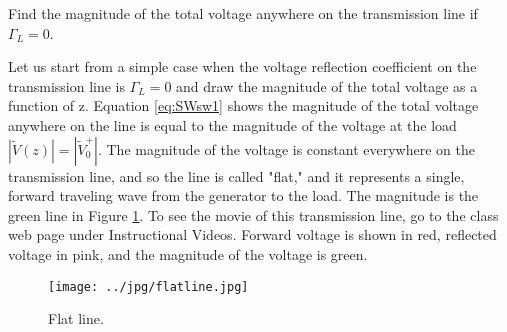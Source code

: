 \documentclass{ximera}
\begin{document}
\begin{example}

Find the magnitude of the total voltage anywhere on the transmission line if $\Gamma_L=0$.

\begin{explanation}
 Let us start from a simple case when the voltage reflection coefficient on the
transmission line is $\Gamma_L=0$ and draw the magnitude of the total
voltage as a function of z. Equation \ref{eq:SWsw1} shows the magnitude of the total voltage anywhere on the line is equal to the magnitude of the voltage at the load $|\tilde{V}(z)|= |\tilde{V}_0^+|$.  The magnitude of the voltage is constant everywhere on the transmission line, and so the line
is called "flat," and it represents a single, forward traveling wave from the generator to the load. The magnitude is the green line in Figure \ref{fig:SWflatline}. To see the movie
of this transmission line, go to the class web page under Instructional Videos. Forward voltage is shown in red, reflected voltage in pink,
and the magnitude of the voltage is green.




\begin{figure}[htbp]
\begin{center}
\texttt{[image: ../jpg/flatline.jpg]}
\end{center}
\caption{Flat line.}
\label{fig:SWflatline}
\end{figure}
\end{explanation}

\end{example}
\end{document}
